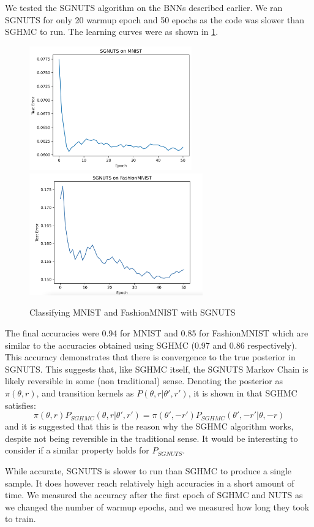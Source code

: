 We tested the SGNUTS algorithm on the BNNs described earlier. We ran SGNUTS for only 20 warmup epoch and 50 epochs as the code was slower than SGHMC to run. The learning curves were as shown in \cref{SGNUTS_results}.

\begin{figure}[h!]
\centering
\includegraphics[width=70mm]{parts/Images/SGNUTS_MNIST.png}
\includegraphics[width=75mm]{parts/Images/SGNUTS_Fashion.png}
\caption{Classifying MNIST and FashionMNIST with SGNUTS}
\label{SGNUTS_results}
\end{figure}

The final accuracies were 0.94 for MNIST and 0.85 for FashionMNIST which are similar to the accuracies obtained using SGHMC (0.97 and 0.86 respectively). This accuracy demonstrates that there is convergence to the true posterior in SGNUTS. This suggests that, like SGHMC itself, the SGNUTS Markov Chain is likely reversible in some (non traditional) sense. Denoting the posterior as $\pi(\theta, r)$, and transition kernels as $P(\theta, r| \theta', r')$, it is shown in \cite{sghmc} that SGHMC satisfies:
$$ \pi(\theta,r)P_{SGHMC}(\theta,r|\theta',r') = \pi(\theta',-r')P_{SGHMC}(\theta',-r'|\theta,-r)$$
and it is suggested that this is the reason why the SGHMC algorithm works, despite not being reversible in the traditional sense. It would be interesting to consider if a similar property holds for $P_{SGNUTS}$.

While accurate, SGNUTS is slower to run than SGHMC to produce a single sample. It does however reach relatively high accuracies in a short amount of time. We measured the accuracy after the first epoch of SGHMC and NUTS as we changed the number of warmup epochs, and we measured how long they took to train.

